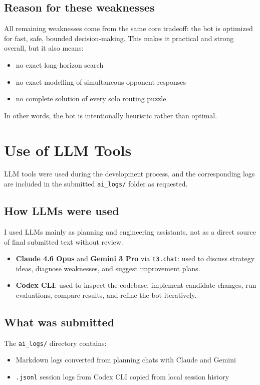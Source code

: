 \documentclass[11pt,a4paper]{article}
\begin{document}
\subsection{Reason for these weaknesses}
All remaining weaknesses come from the same core tradeoff: the bot is optimized for fast, safe, bounded decision-making. This makes it practical and strong overall, but it also means:
\begin{itemize}[leftmargin=*]
    \item no exact long-horizon search
    \item no exact modelling of simultaneous opponent responses
    \item no complete solution of every solo routing puzzle
\end{itemize}

In other words, the bot is intentionally heuristic rather than optimal.

\section{Use of LLM Tools}
LLM tools were used during the development process, and the corresponding logs are included in the submitted \texttt{ai\_logs/} folder as requested.

\subsection{How LLMs were used}
I used LLMs mainly as planning and engineering assistants, not as a direct source of final submitted text without review.
\begin{itemize}[leftmargin=*]
    \item \textbf{Claude 4.6 Opus} and \textbf{Gemini 3 Pro} via \texttt{t3.chat}: used to discuss strategy ideas, diagnose weaknesses, and suggest improvement plans.
    \item \textbf{Codex CLI}: used to inspect the codebase, implement candidate changes, run evaluations, compare results, and refine the bot iteratively.
\end{itemize}

\subsection{What was submitted}
The \texttt{ai\_logs/} directory contains:
\begin{itemize}[leftmargin=*]
    \item Markdown logs converted from planning chats with Claude and Gemini
    \item \texttt{.jsonl} session logs from Codex CLI copied from local session history
\end{itemize}
\end{document}
